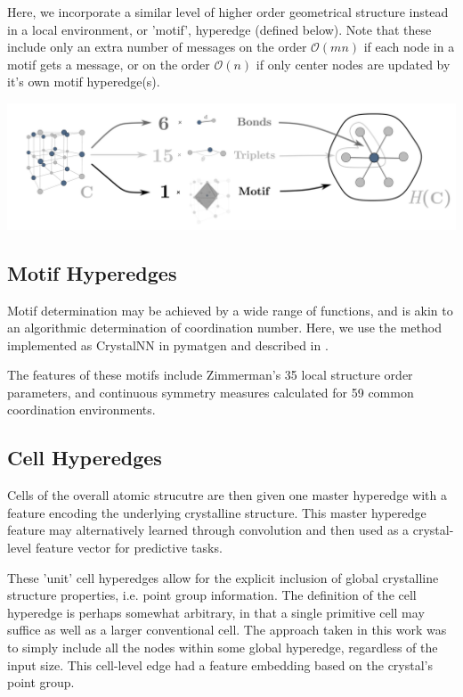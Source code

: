 \documentclass[10pt,a4paper]{article}
\begin{document}
Here, we incorporate a similar level of higher order geometrical structure instead in a local environment, or 'motif', hyperedge (defined below). Note that these include only an extra number of messages on the order $\mathcal{O}(mn)$ if each node in a motif gets a message, or on the order $\mathcal{O}(n)$ if only center nodes are updated by it's own motif hyperedge(s).

\begin{center}


\includegraphics[scale=0.13]{revamp2.pdf}

\end{center}


\subsection{Motif Hyperedges}
Motif determination may be achieved by a wide range of functions, and is akin to an algorithmic determination of coordination number. Here, we use the method implemented as CrystalNN in pymatgen and described in \cite{crystalnn}.


The features of these motifs include Zimmerman's 35 local structure order parameters, and continuous symmetry measures calculated for 59 common coordination environments.

\subsection{Cell Hyperedges}
Cells of the overall atomic strucutre are then given one master hyperedge with a feature encoding the underlying crystalline structure. This master hyperedge feature may alternatively learned through convolution and then used as a crystal-level feature vector for predictive tasks.

These 'unit' cell hyperedges allow for the explicit inclusion of global crystalline structure properties, i.e. point group information. The definition of the cell hyperedge is perhaps somewhat arbitrary, in that a single primitive cell may suffice as well as a larger conventional cell. The approach taken in this work was to simply include all the nodes within some global hyperedge, regardless of the input size. This cell-level edge had a feature embedding based on the crystal's point group.
\end{document}
